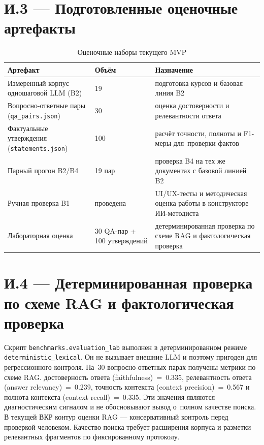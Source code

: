 \section*{И.3 — Подготовленные оценочные артефакты}

\begin{table}[H]
  \caption{Оценочные наборы текущего MVP}
  \label{tab:appendix-assets}
  \centering
  \begingroup
  \small
  \setlength{\tabcolsep}{3pt}
  \renewcommand{\arraystretch}{1.12}
  \begin{tabular}{|P{5.0cm}|P{2.0cm}|P{5.5cm}|}
  \hline
  \textbf{Артефакт} & \textbf{Объём} & \textbf{Назначение} \\
  \hline
  Измеренный корпус одношаговой LLM (B2) & 19 & подготовка курсов и базовая линия B2 \\
  \hline
  Вопросно-ответные пары (\texttt{qa\_pairs.json}) & 30 & оценка достоверности и релевантности ответа \\
  \hline
  Фактуальные утверждения (\texttt{statements.json}) & 100 & расчёт точности, полноты и F1-меры для~проверки фактов \\
  \hline
  Парный прогон B2/B4 & 19 пар & проверка B4 на тех же документах с базовой линией B2 \\
  \hline
  Ручная проверка B1 & проведена & UI/UX-тесты и методическая оценка работы в конструкторе ИИ-методиста \\
  \hline
  Лабораторная оценка & 30 QA-пар + 100 утверждений & детерминированная проверка по схеме RAG и фактологическая проверка \\
  \hline
  \end{tabular}
  \endgroup
\end{table}

\section*{И.4 — Детерминированная проверка по схеме RAG и фактологическая проверка}

Скрипт \texttt{benchmarks.evaluation\_lab} выполнен в
детерминированном режиме \texttt{deterministic\_lexical}. Он не
вызывает внешние LLM и поэтому пригоден для регрессионного контроля.
На~30 вопросно-ответных парах получены метрики по схеме RAG.
достоверность ответа (faithfulness)~=~0.335,
релевантность ответа (answer relevancy)~=~0.239,
точность контекста (context precision)~=~0.567 и
полнота контекста (context recall)~=~0.335. Эти значения являются
диагностическим сигналом и не обосновывают вывод о~полном качестве
поиска. В текущей ВКР контур оценки RAG — консервативный
контроль перед проверкой человеком. Качество поиска
требует расширения корпуса и разметки релевантных фрагментов по
фиксированному протоколу.

